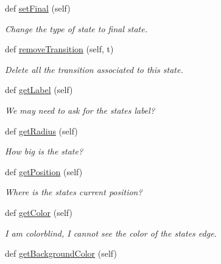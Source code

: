 \begin{DoxyCompactItemize}
\mbox{\label{classState_1_1State_aa420a44ab0e89912179b5dfe9ae042cd}} 
def \mbox{\hyperlink{classState_1_1State_aa420a44ab0e89912179b5dfe9ae042cd}{set\+Final}} (self)
\begin{DoxyCompactList}\small\item\em Change the type of state to final state. \end{DoxyCompactList}\item 
\mbox{\label{classState_1_1State_a40eeeceb18a42ea92a7c0983523efe9a}} 
def \mbox{\hyperlink{classState_1_1State_a40eeeceb18a42ea92a7c0983523efe9a}{remove\+Transition}} (self, t)
\begin{DoxyCompactList}\small\item\em Delete all the transition associated to this state. \end{DoxyCompactList}\item 
def \mbox{\hyperlink{classState_1_1State_a1f81501729708ce030ae8a29889482d2}{get\+Label}} (self)
\begin{DoxyCompactList}\small\item\em We may need to ask for the state\textquotesingle{}s label? \end{DoxyCompactList}\item 
def \mbox{\hyperlink{classState_1_1State_afa144794f02bc71f49e1521f5a47afbf}{get\+Radius}} (self)
\begin{DoxyCompactList}\small\item\em How big is the state? \end{DoxyCompactList}\item 
def \mbox{\hyperlink{classState_1_1State_aaf60cf2700a02509c78256855429ef8c}{get\+Position}} (self)
\begin{DoxyCompactList}\small\item\em Where is the state\textquotesingle{}s current position? \end{DoxyCompactList}\item 
def \mbox{\hyperlink{classState_1_1State_ac432a1d641421836ccec98b421b82852}{get\+Color}} (self)
\begin{DoxyCompactList}\small\item\em I am colorblind, I cannot see the color of the state\textquotesingle{}s edge. \end{DoxyCompactList}\item 
def \mbox{\hyperlink{classState_1_1State_a3844e06a4d0a60cb9d95cb22b168705e}{get\+Background\+Color}} (self)

\end{DoxyCompactItemize}
